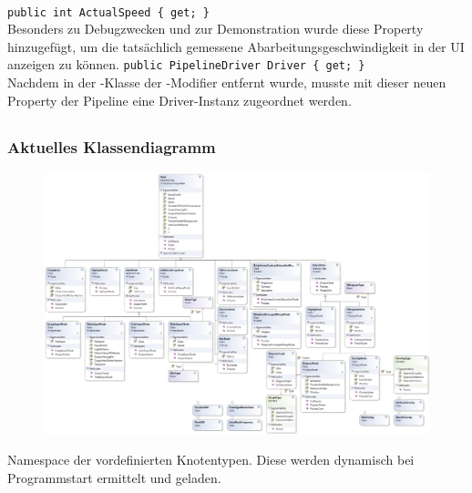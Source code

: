 \paragraph{}
\begin{itemize}
	\add \verb!public int ActualSpeed { get; }! \\
	Besonders zu Debugzwecken und zur Demonstration wurde diese Property hinzugefügt, um die tatsächlich gemessene Abarbeitungsgeschwindigkeit in der UI anzeigen zu können.
	\add \verb!public PipelineDriver Driver { get; }! \\
	Nachdem in der -Klasse der -Modifier entfernt wurde, musste mit dieser neuen Property der Pipeline eine Driver-Instanz zugeordnet werden.
\end{itemize}
\newpage

\subsection{}

\subsubsection*{Aktuelles Klassendiagramm}
\begin{figure}[h!]
\begin{center}
\includegraphics[width=0.8\textheight,angle=90]{classdiagram/pipe-imp.png}
\end{center}
\end{figure}
Namespace der vordefinierten Knotentypen. Diese werden dynamisch bei Programmstart ermittelt und geladen.
\newpage


